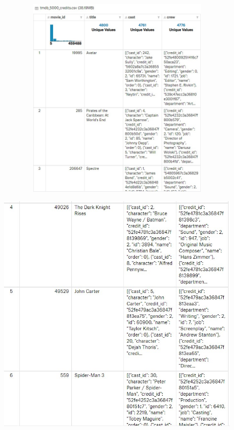 \begin{center}
\includegraphics[width=14cm, height=10cm]{./Imagenes/img3.jpg}
\end{center}


\begin{center}
\includegraphics[width=14cm, height=12cm]{./Imagenes/img4.jpg}
\end{center}


